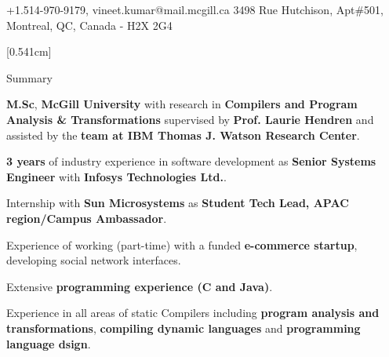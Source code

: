 \documentclass{resume} %
\begin{document}
\begin{hSubsection}{+1.514-970-9179, vineet.kumar@mail.mcgill.ca}
{%
}{3498 Rue Hutchison, Apt\#501, Montreal, QC, Canada - H2X 2G4}
\end{hSubsection}



[0.541cm]
\begin{rSection}{Summary}
\smallskip
\begin{lSubsection}
 \item \textbf{M.Sc}, \textbf{McGill University} with research in \textbf{Compilers and Program Analysis \& Transformations} supervised by \textbf{Prof. Laurie Hendren} and assisted by the \textbf{\xten team at IBM Thomas J. Watson Research Center}.
 \item \textbf{3 years} of industry experience in software development as \textbf{Senior Systems Engineer} with \textbf{Infosys Technologies Ltd.}.
 \item Internship with \textbf{Sun Microsystems} as \textbf{Student Tech Lead, APAC region/Campus Ambassador}.
 \item Experience of working (part-time) with a funded \textbf{e-commerce startup}, developing social network interfaces.
 \item Extensive \textbf{programming experience (C and Java)}.
 \item Experience in all areas of static Compilers including \textbf{program analysis and transformations}, \textbf{compiling dynamic languages} and \textbf{programming language dsign}.
 
\end{lSubsection}
\end{rSection}
\end{document}
